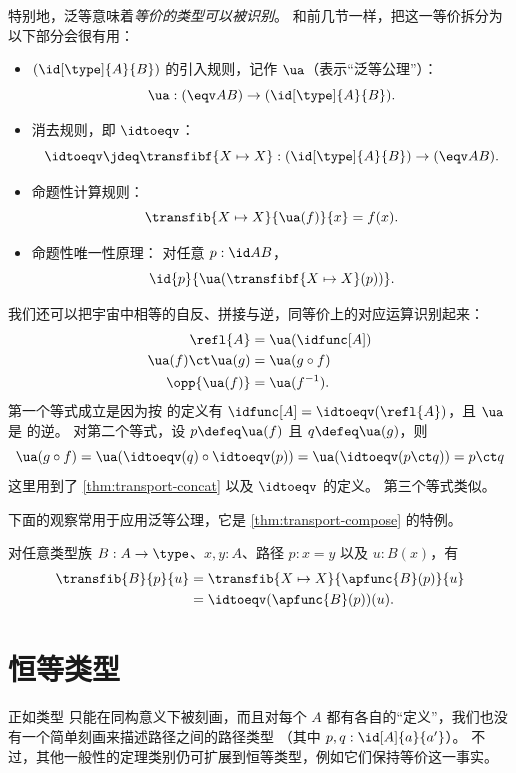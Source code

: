 特别地，泛等意味着\emph{等价的类型可以被识别}。
和前几节一样，把这一等价拆分为以下部分会很有用：
%
\begin{itemize}
\item {$(\id[\type]{A}{B})$} 的引入规则，记作 $\ua$（表示“泛等公理”）：
  \[
  \ua : ({\eqv A B}) \to (\id[\type]{A}{B}).
  \]
\item 消去规则，即 $\idtoeqv$：
  \[
  \idtoeqv \jdeq \transfibf{X \mapsto X} : (\id[\type]{A}{B}) \to (\eqv A B).
  \]
\item 命题性计算规则：
  \[
  \transfib{X \mapsto X}{\ua(f)}{x} = f(x).
  \]
\item 命题性唯一性原理：
  对任意 $p : \id A B$，
  \[
  \id{p}{\ua(\transfibf{X \mapsto X}(p))}.
  \]
\end{itemize}
%
我们还可以把宇宙中相等的自反、拼接与逆，同等价上的对应运算识别起来：
\begin{align*}
  \refl{A} &= \ua(\idfunc[A]) \\
  \ua(f) \ct \ua(g) &= \ua(g\circ f) \\
  \opp{\ua(f)} &= \ua(f^{-1}).
\end{align*}
第一个等式成立是因为按 \idtoeqv 的定义有 $\idfunc[A] = \idtoeqv(\refl{A})$，且 $\ua$ 是 \idtoeqv 的逆。
对第二个等式，设 $p \defeq \ua(f)$ 且 $q\defeq \ua(g)$，则
\[ \ua(g\circ f) = \ua(\idtoeqv(q) \circ \idtoeqv(p)) = \ua(\idtoeqv(p\ct q)) = p\ct q\]
这里用到了 \cref{thm:transport-concat} 以及 $\idtoeqv$ 的定义。
第三个等式类似。

下面的观察常用于应用泛等公理，它是 \cref{thm:transport-compose} 的特例。

\begin{lem}\label{thm:transport-is-ap}
  对任意类型族 $B:A\to\type$、$x,y:A$、路径 $p:x=y$ 以及 $u:B(x)$，有
  \begin{align*}
    \transfib{B}{p}{u} &= \transfib{X\mapsto X}{\apfunc{B}(p)}{u}\\
    &= \idtoeqv(\apfunc{B}(p))(u).
  \end{align*}
\end{lem}

%
%
\section{恒等类型}
\label{sec:compute-paths}

%
正如类型  只能在同构意义下被刻画，而且对每个 $A$ 都有各自的“定义”，我们也没有一个简单刻画来描述路径之间的路径类型 （其中 $p,q : \id[A]{a}{a'}$）。
不过，其他一般性的定理类别仍可扩展到恒等类型，例如它们保持等价这一事实。

